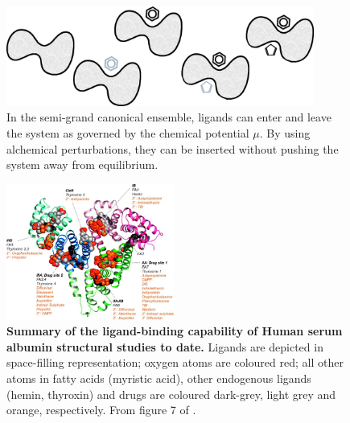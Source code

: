 \documentclass[10pt,final]{article}
\begin{document}
\begin{figure}[H]
  \centering
  \includegraphics[width=0.9\textwidth]{figures/semi-grand.png}
  \caption{In the semi-grand canonical ensemble, ligands can enter and leave the system as governed by the chemical potential $\mu$. By using alchemical perturbations, they can be inserted without pushing the system away from equilibrium.}
  \label{figure:semigrand}
\end{figure}


\begin{figure}
	\centering	
	\includegraphics[width=0.49\textwidth]{figures/hsa_fig7_ghuman2005.jpg}
	\caption{\textbf{Summary of the ligand-binding capability of Human serum albumin structural studies to date.} Ligands are depicted in space-filling representation; oxygen atoms are coloured red; all other atoms in fatty acids (myristic acid), other endogenous ligands (hemin, thyroxin) and drugs are coloured dark-grey, light grey and orange, respectively. From figure 7 of \cite{Ghuman2005a}.}
	\label{figure:albumin}
\end{figure} 
\end{document}
